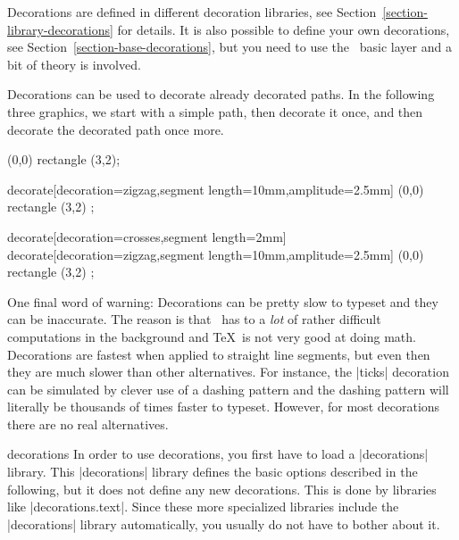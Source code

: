 Decorations are defined in different decoration libraries, see
Section~\ref{section-library-decorations} for details. It is also possible to
define your own decorations, see Section~\ref{section-base-decorations}, but
you need to use the \pgfname\ basic layer and a bit of theory is involved.

Decorations can be used to decorate already decorated paths. In the following
three graphics, we start with a simple path, then decorate it once, and then
decorate the decorated path once more.
%
\begin{codeexample}[]
\tikz \fill [fill=blue!20,draw=blue,thick]
  (0,0) rectangle (3,2);
\end{codeexample}
%
\begin{codeexample}[preamble={\usetikzlibrary{decorations.pathmorphing}}]
\tikz \fill [fill=blue!20,draw=blue,thick]
  decorate[decoration={zigzag,segment length=10mm,amplitude=2.5mm}]
    { (0,0) rectangle (3,2) };
\end{codeexample}
%
\begin{codeexample}[preamble={\usetikzlibrary{
    decorations.pathmorphing,
    decorations.shapes,
}}]
\tikz \fill [fill=blue!20,draw=blue,thick]
  decorate[decoration={crosses,segment length=2mm}] {
    decorate[decoration={zigzag,segment length=10mm,amplitude=2.5mm}] {
      (0,0) rectangle (3,2)
    }
  };
\end{codeexample}

One final word of warning: Decorations can be pretty slow to typeset and they
can be inaccurate. The reason is that \pgfname\ has to a \emph{lot} of rather
difficult computations in the background and \TeX\ is not very good at doing
math. Decorations are fastest when applied to straight line segments, but even
then they are much slower than other alternatives. For instance, the |ticks|
decoration can be simulated by clever use of a dashing pattern and the dashing
pattern will literally be thousands of times faster to typeset. However, for
most decorations there are no real alternatives.

\begin{tikzlibrary}{decorations}
    In order to use decorations, you first have to load a |decorations| library.
    This |decorations| library defines the basic options described in the
    following, but it does not define any new decorations. This is done by
    libraries like |decorations.text|. Since these more specialized libraries
    include the |decorations| library automatically, you usually do not have to
    bother about it.
\end{tikzlibrary}


